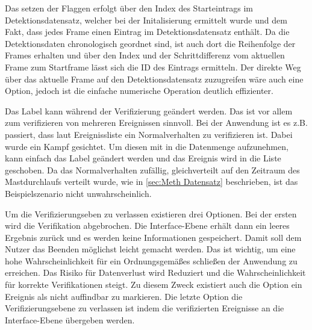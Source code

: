 Das setzen der Flaggen erfolgt über den Index des Starteintrags im Detektionsdatensatz, welcher bei der Initalisierung ermittelt wurde und dem Fakt, dass jedes Frame einen Eintrag im Detektionsdatensatz enthält. Da die Detektionsdaten chronologisch geordnet sind, ist auch dort die Reihenfolge der Frames erhalten und über den Index und der Schrittdifferenz vom aktuellen Frame zum Startframe lässt sich die ID des Eintrags ermitteln. Der direkte Weg über das aktuelle Frame auf den Detektionsdatensatz zuzugreifen wäre auch eine Option, jedoch ist die einfache numerische Operation deutlich effizienter. \par

Das Label kann während der Verifizierung geändert werden. Das ist vor allem zum verifizieren von mehreren Ereignissen sinnvoll. Bei der Anwendung ist es z.B. passiert, dass laut Ereignissliste ein Normalverhalten zu verifizieren ist. Dabei wurde ein Kampf gesichtet. Um diesen mit in die Datenmenge aufzunehmen, kann einfach das Label geändert werden und das Ereignis wird in die Liste geschoben. Da das Normalverhalten zufällig, gleichverteilt auf den Zeitraum des Mastdurchlaufs verteilt wurde, wie in \autoref{sec:Meth Datensatz} beschrieben, ist das Beispielszenario nicht unwahrscheinlich. \par

Um die Verifizierungseben zu verlassen existieren drei Optionen. Bei der ersten wird die Verifikation abgebrochen. Die Interface-Ebene erhält dann ein leeres Ergebnis zurück und es werden keine Informationen gespeichert. Damit soll dem Nutzer das Beenden möglichst leicht gemacht werden. Das ist wichtig, um eine hohe Wahrscheinlichkeit für ein Ordnungsgemäßes schließen der Anwendung zu erreichen. Das Risiko für  Datenverlust wird Reduziert und die Wahrscheinlichkeit für korrekte Verifikationen steigt. Zu diesem Zweck existiert auch die Option ein Ereignis als nicht auffindbar zu markieren. Die letzte Option die Verifizierungsebene zu verlassen ist indem die verifizierten Ereignisse an die Interface-Ebene übergeben werden. 

